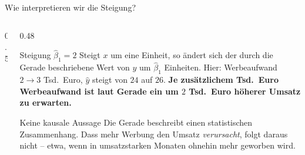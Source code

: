 \documentclass[aspectratio=169,11pt]{beamer}
\newcommand{\uebpunkte}{\addplot[only marks, mark=*, mark size=2.6pt, color=hsbiblue]
  coordinates {(1,21) (2,26) (3,24) (4,30) (5,29)};}
\begin{document}
\begin{frame}{Wie interpretieren wir die Steigung?}
  \begin{columns}[T]
    \begin{column}{0.5\textwidth}
    \end{column}
    \begin{column}{0.48\textwidth}
      \small
      \begin{block}{Steigung $\hat{\beta}_1 = 2$}
        Steigt $x$ um eine Einheit, so ändert sich der durch die Gerade
        beschriebene Wert von $y$ um $\hat{\beta}_1$ Einheiten. Hier:
        Werbeaufwand $2 \to 3$ Tsd.\ Euro, $\hat{y}$ steigt von $24$ auf $26$.
        \textbf{Je zusätzlichem Tsd.\ Euro Werbeaufwand ist laut Gerade ein um
        $2$ Tsd.\ Euro höherer Umsatz zu erwarten.}
      \end{block}
      \begin{alertblock}{Keine kausale Aussage}
        Die Gerade beschreibt einen statistischen Zusammenhang. Dass mehr
        Werbung den Umsatz \emph{verursacht}, folgt daraus nicht -- etwa, wenn
        in umsatzstarken Monaten ohnehin mehr geworben wird.
      \end{alertblock}
    \end{column}
  \end{columns}
\end{frame}
\end{document}
